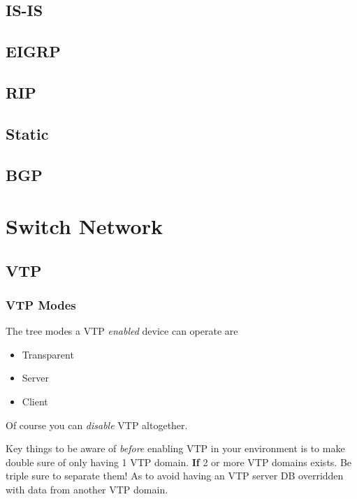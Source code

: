\documentclass[a4paper,12pt,twoside,twocolumn]{book}
\begin{document}
\subsection{IS-IS}
\subsection{EIGRP}
\subsection{RIP}
\subsection{Static}
\subsection{BGP}

\newpage

\section{Switch Network}

\subsection{VTP}

\subsubsection{VTP Modes}
The tree modes a VTP \textit{enabled} device can operate are
\begin{itemize}
    \item Transparent
    \item Server
    \item Client
\end{itemize}
Of course you can \textit{disable} VTP altogether.

Key things to be aware of \textit{before} enabling VTP in your environment is to make double sure of only having 1 VTP domain. \textbf{If} 2 or more VTP domains exists. Be triple sure to separate them! As to avoid having an VTP server DB overridden with data from another VTP domain.
\end{document}

